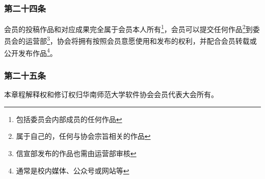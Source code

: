 \documentclass[
]{ctexart}
\begin{document}
\hypertarget{ux7b2cux516dux6761-ux6838ux5fc3ux4f1aux5458}{%
\subsubsection{第二十四条}\label{ux7b2cux516dux6761-ux6838ux5fc3ux4f1aux5458}}

会员的投稿作品和对应成果完全属于会员本人所有\footnote{包括委员会内部成员的任何作品}，会员可以提交任何作品\footnote{属于自己的，任何与协会宗旨相关的作品}到委员会的运营部\footnote{信宣部发布的作品也需由运营部审核}，协会将拥有按照会员意愿使用和发布的权利，并配合会员转载或公开发布作品\footnote{通常是校内媒体、公众号或网站等}。

\hypertarget{ux7b2cux4e8cux5341ux4e09ux6761-ux5173ux4e8eux672cux7ae0ux7a0b}{%
\subsubsection{第二十五条}\label{ux7b2cux4e8cux5341ux4e09ux6761-ux5173ux4e8eux672cux7ae0ux7a0b}}

本章程解释权和修订权归华南师范大学软件协会会员代表大会所有。
\end{document}
